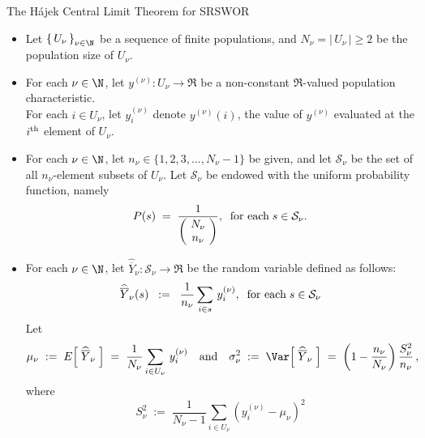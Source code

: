 
\begin{frame}{\large The H\'ajek Central Limit Theorem for SRSWOR}

{\tiny
\begin{itemize}
\item	Let $\left\{\,U_{\nu}\,\right\}_{\nu \in \N}$ be a sequence of finite populations,
and $N_{\nu} = \left\vert\,U_{\nu}\,\right\vert \geq 2$ be the population size of $U_{\nu}$.
\item For each $\nu \in \N$, let $y^{(\nu)} : U_{\nu} \longrightarrow \Re$ be a non-constant $\Re$-valued population characteristic.\\
For each $i \in U_{\nu}$, let $y^{(\nu)}_{i}$ denote $y^{(\nu)}(i)$,
the value of $y^{(\nu)}$ evaluated at the $i^{\textnormal{th}}$ element of $U_{\nu}$.
\item For each $\nu \in \N$, let $n_{\nu} \in \{ 1,2,3,\ldots,N_{\nu}-1 \}$ be given,
and let $\mathcal{S}_{\nu}$ be the set of all $n_{\nu}$-element subsets of $U_{\nu}$.
Let $\mathcal{S}_{\nu}$ be endowed with the uniform probability function, namely
\begin{equation*}
P(s) \; = \; \dfrac{1}{\left(\!\begin{array}{c} N_{\nu} \\ n_{\nu} \end{array}\!\right)},
\;\;\textnormal{for each}\; s \in \mathcal{S}_{\nu}.
\end{equation*}
\item For each $\nu \in \N$, let $\widehat{\overline{Y}}_{\nu} : \mathcal{S}_{\nu} \longrightarrow \Re$ be the random variable
defined as follows:
\begin{equation*}
\widehat{\overline{Y}}_{\nu}(s)
\;\;:=\;\;
\dfrac{1}{n_{\nu}}\sum_{i \in s}\, y^{(\nu)}_{i},
\;\;\textnormal{for each}\; s \in \mathcal{S}_{\nu}
\end{equation*}
Let
\begin{equation*}
\mu_{\nu} \;:=\; E\!\left[\;\widehat{\overline{Y}}_{\nu}\;\right] \;=\; \dfrac{1}{N_{\nu}}\sum_{i \in U_{\nu}}\,y^{(\nu)}_{i}
\quad\textnormal{and}\quad
\sigma^{2}_{\nu} \;:=\; \Var\!\left[\;\widehat{\overline{Y}}_{\nu}\;\right] \;=\; \left(1 - \dfrac{n_{\nu}}{N_{\nu}}\right)\dfrac{S^{2}_{\nu}}{n_{\nu}}\,,
\end{equation*}
where
\begin{equation*}
S^{2}_{\nu} \;:=\; \dfrac{1}{N_{\nu} - 1}\sum_{i \in U_{\nu}}\left(y^{(\nu)}_{i} - \mu_{\nu}\right)^{2}

\end{equation*}
\end{itemize}}
\end{frame}
